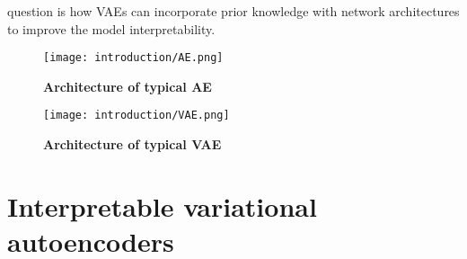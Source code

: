 question is how VAEs can incorporate prior knowledge with network architectures to improve the model interpretability.\vspace{2mm}

\begin{figure}[h!]
    \centering
    \texttt{[image: introduction/AE.png]}
    \caption{\small{\textbf{Architecture of typical AE}}}
    \label{fig:graphical_abstract_AE}
\end{figure}

\begin{figure}[h!]
    \centering
    \texttt{[image: introduction/VAE.png]}
    \caption{\small{\textbf{Architecture of typical VAE}}}
    \label{fig:graphical_abstract_VAE}
\end{figure}

\section{Interpretable variational autoencoders}\label{introduction:model}
